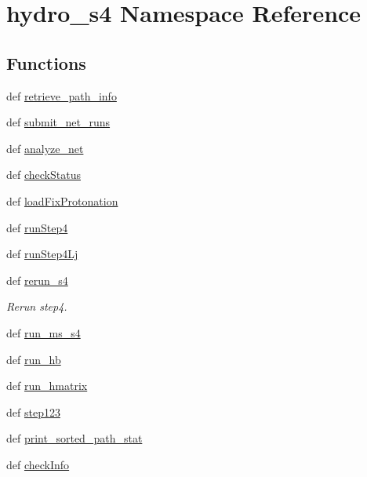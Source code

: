 \hypertarget{namespacehydro__s4}{\section{hydro\-\_\-s4 Namespace Reference}
\label{namespacehydro__s4}
}
\subsection*{Functions}
\begin{DoxyCompactItemize}
\item 
def \hyperlink{namespacehydro__s4_a09d1b3086e60ec39814fac9222fbf6e9}{retrieve\-\_\-path\-\_\-info}
\item 
def \hyperlink{namespacehydro__s4_a84efdf2c7682a49ebeec95bad2ed1b43}{submit\-\_\-net\-\_\-runs}
\item 
def \hyperlink{namespacehydro__s4_a19775315ffa377ec4362c0defb7905e9}{analyze\-\_\-net}
\item 
def \hyperlink{namespacehydro__s4_a532b87faa5dc46de42387352c1c08071}{check\-Status}
\item 
def \hyperlink{namespacehydro__s4_a7a3beb0b2c6ee58bd33c4cae636f45fb}{load\-Fix\-Protonation}
\item 
def \hyperlink{namespacehydro__s4_a6a0f0635f4f460969b988bc061b80583}{run\-Step4}
\item 
def \hyperlink{namespacehydro__s4_ad407d21a557d92f2322734e9de19a6d2}{run\-Step4\-Lj}
\item 
def \hyperlink{namespacehydro__s4_a8f7ffd177dad6b787fca7f1a2eb3e200}{rerun\-\_\-s4}
\begin{DoxyCompactList}\small\item\em Rerun step4. \end{DoxyCompactList}\item 
def \hyperlink{namespacehydro__s4_a39d446be37a51f34f87ca702957b0c82}{run\-\_\-ms\-\_\-s4}
\item 
def \hyperlink{namespacehydro__s4_a687c31ef0ef7c711b51f02ae7ac08484}{run\-\_\-hb}
\item 
def \hyperlink{namespacehydro__s4_a1569c8baf468e0d1f4c48098937b9d66}{run\-\_\-hmatrix}
\item 
def \hyperlink{namespacehydro__s4_a6f00d34115ad30d897394b6afe80603f}{step123}
\item 
def \hyperlink{namespacehydro__s4_a9b58fe10ed7e8ff274e235281968a780}{print\-\_\-sorted\-\_\-path\-\_\-stat}
\item 
def \hyperlink{namespacehydro__s4_aac0bbdc3aaf661647adab02217f06d65}{check\-Info}

\end{DoxyCompactItemize}
